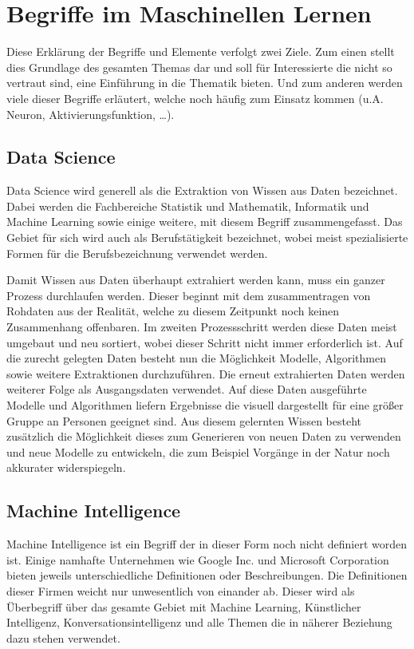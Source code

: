 \chapter{Begriffe im Maschinellen Lernen}
\label{cha:Begriffe}

Diese Erklärung der Begriffe und Elemente verfolgt zwei Ziele.
Zum einen stellt dies Grundlage des gesamten Themas dar und soll für Interessierte die nicht so vertraut sind, eine Einführung in die Thematik bieten. 
Und zum anderen werden viele dieser Begriffe erläutert, welche noch häufig zum Einsatz kommen (u.A. Neuron, Aktivierungsfunktion, …).

\section{Data Science}

Data Science wird generell als die Extraktion von Wissen aus Daten bezeichnet. 
Dabei werden die Fachbereiche Statistik und Mathematik, Informatik und Machine Learning sowie einige weitere, mit diesem Begriff zusammengefasst. 
Das Gebiet für sich wird auch als Berufstätigkeit bezeichnet, wobei meist spezialisierte Formen für die Berufsbezeichnung verwendet werden. \newline

\noindent 
Damit Wissen aus Daten überhaupt extrahiert werden kann, muss ein ganzer Prozess durchlaufen werden. 
Dieser beginnt mit dem zusammentragen von Rohdaten aus der Realität, welche zu diesem Zeitpunkt noch keinen Zusammenhang offenbaren. 
Im zweiten Prozessschritt werden diese Daten meist umgebaut und neu sortiert, wobei dieser Schritt nicht immer erforderlich ist. 
Auf die zurecht gelegten Daten besteht nun die Möglichkeit Modelle, Algorithmen sowie weitere Extraktionen durchzuführen. 
Die erneut extrahierten Daten werden weiterer Folge als Ausgangsdaten verwendet. 
Auf diese Daten ausgeführte Modelle und Algorithmen liefern Ergebnisse die visuell dargestellt für eine größer Gruppe an Personen geeignet sind. 
Aus diesem gelernten Wissen besteht zusätzlich die Möglichkeit dieses zum Generieren von neuen Daten zu verwenden und neue Modelle zu entwickeln, die zum Beispiel Vorgänge in der Natur noch akkurater widerspiegeln.

\section{Machine Intelligence}

Machine Intelligence ist ein Begriff der in dieser Form noch nicht definiert worden ist. 
Einige namhafte Unternehmen wie Google Inc. und Microsoft Corporation bieten jeweils unterschiedliche Definitionen oder Beschreibungen. 
Die Definitionen dieser Firmen weicht nur unwesentlich von einander ab.
Dieser wird als Überbegriff über das gesamte Gebiet mit Machine Learning, Künstlicher Intelligenz, Konversationsintelligenz und alle Themen die in näherer Beziehung dazu stehen verwendet. 

